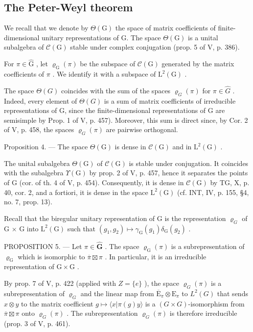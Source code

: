 \subsection{The Peter-Weyl theorem}

We recall that we denote by \(\Theta(\mathrm{G})\) the space of matrix coefficients of finite-dimensional unitary representations of G. The space \(\Theta(\mathrm{G})\) is a unital subalgebra of \(\mathcal{C}(\mathrm{G})\) stable under complex conjugation (prop. 5 of V, p. 386).

For \(\pi \in \widehat{\mathrm{G}}\) , let \(\varrho_{\mathrm{G}}(\pi)\) be the subspace of \(\mathcal{C}(\mathrm{G})\) generated by the matrix coefficients of \(\pi\) . We identify it with a subspace of \(\mathrm{L}^2 (\mathrm{G})\) .

The space \(\Theta(G)\) coincides with the sum of the spaces \(\varrho_{G}(\pi)\) for \(\pi\in\widehat{G}\) . Indeed, every element of \(\Theta(G)\) is a sum of matrix coefficients of irreducible representations of G, since the finite-dimensional representations of G are semisimple by Prop. 1 of V, p. 457). Moreover, this sum is direct since, by Cor. 2 of V, p. 458, the spaces \(\varrho_{G}(\pi)\) are pairwise orthogonal.

Proposition 4. — The space \(\Theta(\mathrm{G})\) is dense in \(\mathcal{C}(\mathrm{G})\) and in \(\mathrm{L}^2(\mathrm{G})\) .

The unital subalgebra \(\Theta(\mathrm{G})\) of \(\mathcal{C}(\mathrm{G})\) is stable under conjugation. It coincides with the subalgebra \(\Upsilon(\mathrm{G})\) by prop. 2 of V, p. 457, hence it separates the points of G (cor. of th. 4 of V, p. 454). Consequently, it is dense in \(\mathcal{C}(\mathrm{G})\) by TG, X, p. 40, cor. 2, and a fortiori, it is dense in the space \(\mathrm{L}^2(\mathrm{G})\) (cf. INT, IV, p. 155, §4, no. 7, prop. 13).

Recall that the biregular unitary representation of G is the representation \(\varrho_{G}\) of G × G into \(\mathrm{L}^{2}(\mathrm{G})\) such that \((g_{1}, g_{2}) \mapsto \gamma_{\mathrm{G}}(g_{1}) \delta_{\mathrm{G}}(g_{2})\) .

PROPOSITION 5. --- Let \(\pi \in \widehat{\mathbf{G}}\) . The space \(\varrho_{\mathrm{G}}(\pi)\) is a subrepresentation of \(\varrho_{\mathrm{G}}\) which is isomorphic to \(\overline{\pi} \boxtimes \pi\) . In particular, it is an irreducible representation of \(\mathrm{G} \times \mathrm{G}\) .

By prop. 7 of V, p. 422 (applied with \(Z = \{e\}\) ), the space \(\varrho_{G}(\pi)\) is a subrepresentation of \(\varrho_{G}\) and the linear map from \(\overline{\mathrm{E}}_{\pi} \otimes \mathrm{E}_{\pi}\) to \(L^2(G)\) that sends \(x \otimes y\) to the matrix coefficient \(g \mapsto \langle x | \pi(g)y \rangle\) is a \((G \times G)\)-isomorphism from \(\overline{\pi} \boxtimes \pi\) onto \(\varrho_{G}(\pi)\) . The subrepresentation \(\varrho_{G}(\pi)\) is therefore irreducible (prop. 3 of V, p. 461).

